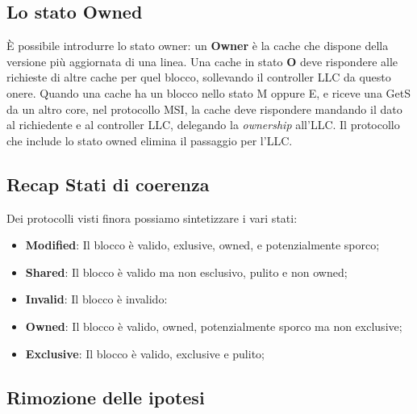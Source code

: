 \subsection{Lo stato Owned}
\uppercase{è} possibile introdurre lo stato owner: un \textbf{Owner} è la cache che dispone della versione più aggiornata di una linea. Una cache in stato \textbf{O} deve rispondere alle richieste di altre cache per quel blocco, sollevando il controller LLC da questo onere. Quando una cache ha un blocco nello stato M oppure E, e riceve una GetS da un altro core, nel protocollo MSI, la cache deve rispondere mandando il dato al richiedente e al controller LLC, delegando la \textit{ownership} all'LLC. Il protocollo che include lo stato owned elimina il passaggio per l'LLC.


\subsection{Recap Stati di coerenza}
Dei protocolli visti finora possiamo sintetizzare i vari stati:

\begin{itemize}
    \item \textbf{Modified}: Il blocco è valido, exlusive, owned, e potenzialmente sporco;
    \item \textbf{Shared}: Il blocco è valido ma non esclusivo, pulito e non owned;
    \item \textbf{Invalid}: Il blocco è invalido:
    \item \textbf{Owned}: Il blocco è valido, owned, potenzialmente sporco ma non exclusive;
    \item \textbf{Exclusive}: Il blocco è valido, exclusive e pulito;
\end{itemize}

\begin{figure}[ht]
    \centering
    \setlength{\fboxrule}{0.5pt} %
    \setlength{\fboxsep}{0pt}    %
\end{figure}

\subsection{Rimozione delle ipotesi}
